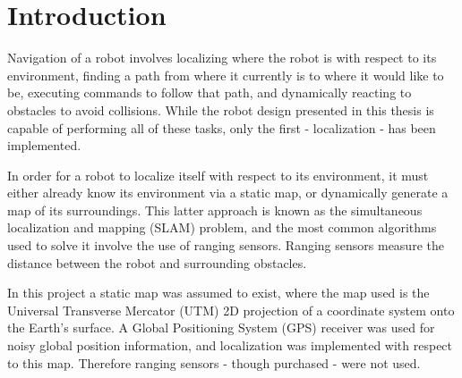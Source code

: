 \chapter*{Introduction}

Navigation of a robot involves localizing where the robot is with respect to its environment, finding a path from where it currently is to where it would like to be, executing commands to follow that path, and dynamically reacting to obstacles to avoid collisions. While the robot design presented in this thesis is capable of performing all of these tasks, only the first - localization - has been implemented.

In order for a robot to localize itself with respect to its environment, it must either already know its environment via a static map, or dynamically generate a map of its surroundings. This latter approach is known as the simultaneous localization and mapping (SLAM) problem, and the most common algorithms used to solve it involve the use of ranging sensors. Ranging sensors measure the distance between the robot and surrounding obstacles.

In this project a static map was assumed to exist, where the map used is the Universal Transverse Mercator (UTM) 2D projection of a coordinate system onto the Earth's surface. A Global Positioning System (GPS) receiver was used for noisy global position information, and localization was implemented with respect to this map. Therefore ranging sensors - though purchased - were not used.





